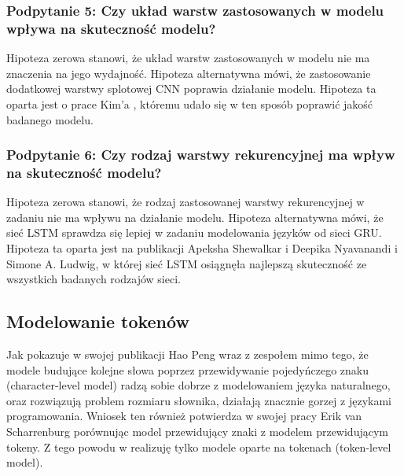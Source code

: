 \subsubsection{Podpytanie 5: Czy układ warstw zastosowanych w modelu wpływa na skuteczność modelu?}
Hipoteza zerowa stanowi, że układ warstw zastosowanych w modelu nie ma znaczenia na jego wydajność. Hipoteza alternatywna mówi, że zastosowanie dodatkowej warstwy 
splotowej CNN poprawia działanie modelu. Hipoteza ta oparta jest o prace Kim'a \cite{kim}, któremu udało się w ten sposób poprawić jakość badanego modelu.  

\subsubsection{Podpytanie 6: Czy rodzaj warstwy rekurencyjnej ma wpływ na skuteczność modelu?}
Hipoteza zerowa stanowi, że rodzaj zastosowanej warstwy rekurencyjnej w zadaniu nie ma wpływu na działanie modelu. Hipoteza alternatywna mówi, że sieć LSTM sprawdza 
się lepiej w zadaniu modelowania języków od sieci GRU. Hipoteza ta oparta jest na publikacji Apeksha Shewalkar i Deepika Nyavanandi i Simone A. Ludwig\cite{lstmvsgru}, 
w której sieć LSTM osiągnęła najlepszą skuteczność ze wszystkich badanych rodzajów sieci. 

\subsection{Modelowanie tokenów}
Jak pokazuje w swojej publikacji Hao Peng wraz z zespołem \cite{character-level} mimo tego, że modele budujące kolejne słowa poprzez 
przewidywanie pojedyńczego znaku (character-level model) radzą sobie dobrze z modelowaniem języka naturalnego, oraz rozwiązują problem rozmiaru słownika, 
działają znacznie gorzej z językami programowania. Wniosek ten również potwierdza w swojej pracy Erik van Scharrenburg \cite{erik} porównując model przewidujący 
znaki z modelem przewidującym tokeny. Z tego powodu w  realizuję tylko modele oparte na tokenach (token-level model). 

